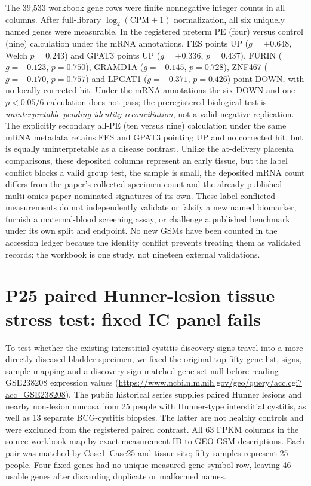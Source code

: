 \documentclass[11pt,a4paper]{article}
\begin{document}
The 39,533 workbook gene rows were finite nonnegative integer counts in all columns. After full-library $\log_2(\mathrm{CPM}+1)$ normalization, all six uniquely named genes were measurable. In the registered preterm PE (four) versus control (nine) calculation under the mRNA annotations, FES points UP ($g=+0.648$, Welch $p=0.243$) and GPAT3 points UP ($g=+0.336$, $p=0.437$). FURIN ($g=-0.123$, $p=0.750$), GRAMD1A ($g=-0.145$, $p=0.728$), ZNF467 ($g=-0.170$, $p=0.757$) and LPGAT1 ($g=-0.371$, $p=0.426$) point DOWN, with no locally corrected hit. Under the mRNA annotations the six-DOWN and one-$p<0.05/6$ calculation does not pass; the preregistered biological test is \emph{uninterpretable pending identity reconciliation}, not a valid negative replication. The explicitly secondary all-PE (ten versus nine) calculation under the same mRNA metadata retains FES and GPAT3 pointing UP and no corrected hit, but is equally uninterpretable as a disease contrast. Unlike the at-delivery placenta comparisons, these deposited columns represent an early tissue, but the label conflict blocks a valid group test, the sample is small, the deposited mRNA count differs from the paper's collected-specimen count and the already-published multi-omics paper nominated signatures of its own. These label-conflicted measurements do not independently validate or falsify a new named biomarker, furnish a maternal-blood screening assay, or challenge a published benchmark under its own split and endpoint. No new GSMs have been counted in the accession ledger because the identity conflict prevents treating them as validated records; the workbook is one study, not nineteen external validations.

\section{P25 paired Hunner-lesion tissue stress test: fixed IC panel fails}
To test whether the existing interstitial-cystitis discovery signs travel into a more directly diseased bladder specimen, we fixed the original top-fifty gene list, signs, sample mapping and a discovery-sign-matched gene-set null before reading GSE238208 expression values (\url{https://www.ncbi.nlm.nih.gov/geo/query/acc.cgi?acc=GSE238208}). The public historical series supplies paired Hunner lesions and nearby non-lesion mucosa from 25 people with Hunner-type interstitial cystitis, as well as 13 separate BCG-cystitis biopsies. The latter are not healthy controls and were excluded from the registered paired contrast. All 63 FPKM columns in the source workbook map by exact measurement ID to GEO GSM descriptions. Each pair was matched by Case1--Case25 and tissue site; fifty samples represent 25 people. Four fixed genes had no unique measured gene-symbol row, leaving 46 usable genes after discarding duplicate or malformed names.
\end{document}
